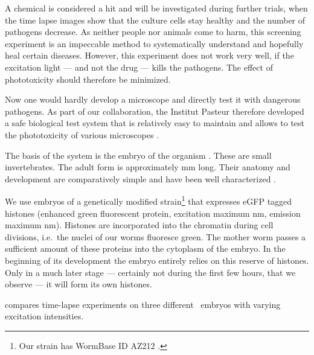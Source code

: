 A chemical is considered a hit and will be investigated during further
trials, when the time lapse images show that the culture cells stay
healthy and the number of pathogens decrease. As neither people nor
animals come to harm, this screening experiment is an impeccable
method to systematically understand and hopefully heal certain
diseases. However, this experiment does not work very well, if the
excitation light --- and not the drug --- kills the pathogens. The
effect of phototoxicity should therefore be minimized.


Now one would hardly develop a microscope and directly test it with
dangerous pathogens. As part of our collaboration, the Institut
Pasteur therefore developed a safe biological test system that is
relatively easy to maintain \citep{Stiernagle2006} and allows to test
the phototoxicity of various microscopes \citep{Tinevez2012}.




The basis of the system is the embryo of the organism \celegans. These
are small invertebrates. The adult form is approximately \unit[1]{mm}
long.  Their anatomy and development are comparatively simple and have
been well characterized \citep{Sulston1977,Durbin1987}.

  

We use embryos of a genetically modified strain\footnote{Our strain
  has WormBase ID AZ212 \citep{Praitis2001}.} that expresses eGFP
tagged histones (enhanced green fluorescent protein, excitation
maximum \unit[488]{nm}, emission maximum \unit[509]{nm}). Histones are
incorporated into the chromatin during cell divisions, i.e.\ the
nuclei of our worms fluoresce green.  The mother worm passes a
sufficient amount of these proteins into the cytoplasm of the
embryo. In the beginning of its development the embryo entirely relies
on this reserve of histones. Only in a much later stage --- certainly
not during the first few hours, that we observe --- it will form its
own histones.

 compares time-lapse experiments on three  
different \celegans\ embryos with varying
excitation intensities.

